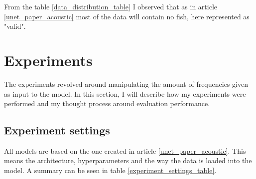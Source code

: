         From the table \ref{data_distribution_table} I observed that as in article \ref{unet_paper_acoustic} most of the data will contain no fish, here represented as "valid".
        
\section{Experiments}
    The experiments revolved around manipulating the amount of frequencies given as input to the model. In this section, I will describe how my experiments were performed and my thought process around evaluation performance. 
    
    \subsection{Experiment settings} \label{Experiment settings}
        All models are based on the one created in article \ref{unet_paper_acoustic}. This means the architecture, hyperparameters and the way the data is loaded into the model. A summary can be seen in table \ref{experiment_settings_table}.
        
